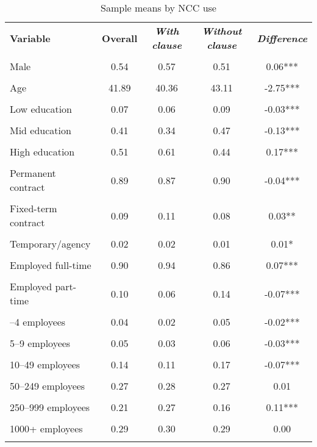 \begin{table}[!ht]\centering
\caption{Sample means by NCC use}
\label{tab:sample_means_ncc_Sweden} %
\begin{tabular}{lcccc}\toprule
\textbf{Variable} & \textbf{Overall} & \textbf{\textit{With clause}} & \textbf{\textit{Without clause}} & \textbf{\textit{Difference}} \\\\ \midrule
Male & 0.54 & 0.57 & 0.51 & 0.06*** \\\\
Age & 41.89 & 40.36 & 43.11 & -2.75*** \\\\
\addlinespace
Low education & 0.07 & 0.06 & 0.09 & -0.03*** \\\\
Mid education & 0.41 & 0.34 & 0.47 & -0.13*** \\\\
High education & 0.51 & 0.61 & 0.44 & 0.17*** \\\\
\addlinespace
Permanent contract & 0.89 & 0.87 & 0.90 & -0.04*** \\\\
Fixed-term contract & 0.09 & 0.11 & 0.08 & 0.03** \\\\
Temporary/agency & 0.02 & 0.02 & 0.01 & 0.01* \\\\
\addlinespace
Employed full-time & 0.90 & 0.94 & 0.86 & 0.07*** \\\\
Employed part-time & 0.10 & 0.06 & 0.14 & -0.07*** \\\\
\addlinespace
1–4 employees & 0.04 & 0.02 & 0.05 & -0.02*** \\\\
5–9 employees & 0.05 & 0.03 & 0.06 & -0.03*** \\\\
10–49 employees & 0.14 & 0.11 & 0.17 & -0.07*** \\\\
50–249 employees & 0.27 & 0.28 & 0.27 & 0.01 \\\\
250–999 employees & 0.21 & 0.27 & 0.16 & 0.11*** \\\\
1000+ employees & 0.29 & 0.30 & 0.29 & 0.00 \\\\
\bottomrule\end{tabular}\end{table}
